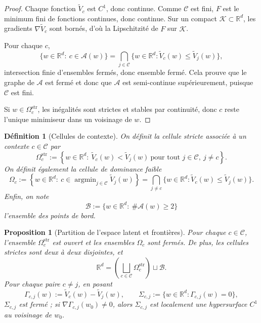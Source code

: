\documentclass[11pt,a4paper]{article}
\newtheorem{definition}{Définition}[section]
\newtheorem{proposition}{Proposition}[section]
\DeclareMathOperator{\argmin}{argmin}
\newcommand{\R}{\mathbb R}
\newcommand{\Ccal}{\mathcal C}
\begin{document}
\begin{proof}
Chaque fonction \(\widetilde V_c\) est \(C^1\), donc continue. Comme \(\Ccal\) est fini, \(F\) est le minimum fini de fonctions continues, donc continue. Sur un compact \(\mathcal K\subset\R^d\), les gradients \(\nabla\widetilde V_c\) sont bornés, d'où la Lipschitzité de \(F\) sur \(\mathcal K\).

Pour chaque \(c\),
\[
\{w\in\R^d:\ c\in\mathcal A(w)\}
=
\bigcap_{j\in\Ccal}\{w\in\R^d:\widetilde V_c(w)\le \widetilde V_j(w)\},
\]
intersection finie d'ensembles fermés, donc ensemble fermé. Cela prouve que le graphe de \(\mathcal A\) est fermé et donc que \(\mathcal A\) est semi-continue supérieurement, puisque \(\Ccal\) est fini.

Si \(w\in\Omega_c^{\mathrm{str}}\), les inégalités sont strictes et stables par continuité, donc \(c\) reste l'unique minimiseur dans un voisinage de \(w\).
\end{proof}

\begin{definition}[Cellules de contexte]
On définit la cellule stricte associée à un contexte \(c\in\Ccal\) par
\[
\Omega_c^{\mathrm{str}}
:=
\left\{
 w\in\R^d:\ \widetilde V_c(w)<\widetilde V_j(w)\ \text{pour tout }j\in\Ccal,\ j\neq c
\right\}.
\]
On définit également la cellule de dominance faible
\[
\Omega_c
:=
\left\{
 w\in\R^d:\ c\in\argmin_{j\in\Ccal}\widetilde V_j(w)
\right\}
=
\bigcap_{j\neq c}\{w\in\R^d:\widetilde V_c(w)\le \widetilde V_j(w)\}.
\]
Enfin, on note
\[
\mathcal B:=\{w\in\R^d:\ \#\mathcal A(w)\ge 2\}
\]
l'ensemble des points de bord.
\end{definition}

\begin{proposition}[Partition de l'espace latent et frontières]
Pour chaque \(c\in\Ccal\), l'ensemble \(\Omega_c^{\mathrm{str}}\) est ouvert et les ensembles \(\Omega_c\) sont fermés. De plus, les cellules strictes sont deux à deux disjointes, et
\[
\R^d
=
\left(\bigsqcup_{c\in\Ccal}\Omega_c^{\mathrm{str}}\right)\sqcup \mathcal B.
\]
Pour chaque paire \(c\neq j\), en posant
\[
\Gamma_{c,j}(w):=\widetilde V_c(w)-\widetilde V_j(w),
\qquad
\Sigma_{c,j}:=\{w\in\R^d:\Gamma_{c,j}(w)=0\},
\]
\(\Sigma_{c,j}\) est fermé ; si \(\nabla\Gamma_{c,j}(w_0)\neq 0\), alors \(\Sigma_{c,j}\) est localement une hypersurface \(C^1\) au voisinage de \(w_0\).
\end{proposition}
\end{document}
